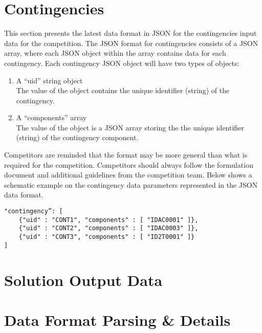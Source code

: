 \documentclass{article}
\begin{document}
\section{Contingencies}
\label{sec:contingency}
This section presents the latest data format in JSON for the contingencies input data for the competition.
The JSON format for contingencies consists of a JSON array,
where each JSON object within the array contains data for each contingency.
Each contingency JSON object will have two types of objects:
\begin{enumerate}
    \item A ``uid'' string object \\
    The value of the object contains the unique identifier (string) of the contingency.
    \item A ``components'' array \\
    The value of the object is a JSON array storing the the unique identifier (string) of the contingency component.
\end{enumerate}
Competitors are reminded that the format may be more general than
what is required for the competition.
Competitors should always
follow the formulation document and additional guidelines from the competition team.
Below shows a schematic example on the contingency data parameters represented in the JSON data format.
\begin{verbatim}
"contingency”: [
    {"uid" : "CONT1", "components" : [ "IDAC0001" ]},
    {"uid" : "CONT2", "components" : [ "IDAC0003" ]},
    {"uid" : "CONT3", "components" : [ "ID2T0001" ]}
]
\end{verbatim}



\section{Solution Output Data}


\section{Data Format Parsing \& Details}

\end{document}
